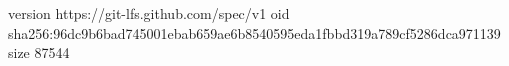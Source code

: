 version https://git-lfs.github.com/spec/v1
oid sha256:96dc9b6bad745001ebab659ae6b8540595eda1fbbd319a789cf5286dca971139
size 87544
